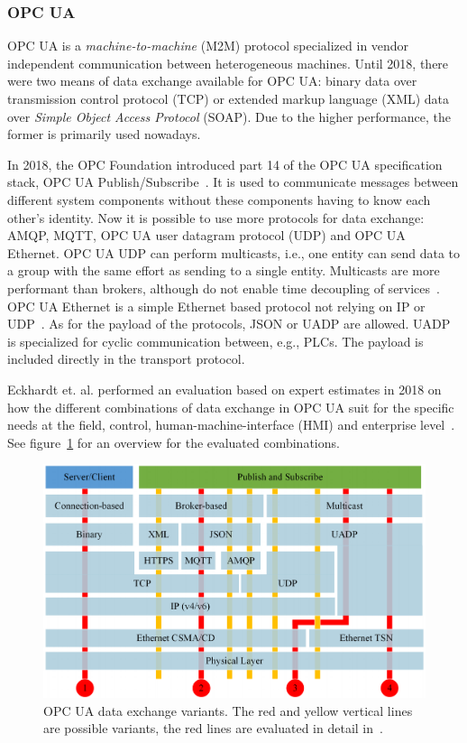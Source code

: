 \subsubsection{OPC UA}
OPC UA is a \textit{machine-to-machine} (M2M) protocol specialized in vendor independent communication between heterogeneous machines. Until 2018, there were two means of data exchange available for OPC UA: binary data over transmission control protocol (TCP) or extended markup language (XML) data over \textit{Simple Object Access Protocol} (SOAP). Due to the higher performance, the former is primarily used nowadays.~\cite{Schleipen2016OPCVariability} 

In 2018, the OPC Foundation introduced part 14 of the OPC UA specification stack, OPC UA Publish/Subscribe~\cite{OPC-Foundation2018OPC1.04}. It is used to communicate messages between different system components without these components having to know each other’s identity. Now it is possible to use more protocols for data exchange: AMQP, MQTT, OPC UA user datagram protocol (UDP) and OPC UA Ethernet. OPC UA UDP can perform multicasts, i.e., one entity can send data to a group with the same effort as sending to a single entity. Multicasts are more performant than brokers, although do not enable time decoupling of services~\cite{Eckhardt2018AnCases}. OPC UA Ethernet is a simple Ethernet based protocol not relying on IP or UDP~\cite{OPC-Foundation2018OPC1.04}. As for the payload of the protocols, JSON or UADP are allowed. UADP is specialized for cyclic communication between, e.g., PLCs. The payload is included directly in the transport protocol.

Eckhardt et. al. performed an evaluation based on expert estimates in 2018 on how the different combinations of data exchange in OPC UA suit for the specific needs at the field, control, human-machine-interface (HMI) and enterprise level~\cite{Eckhardt2018AnCases}. See figure~\ref{fig:opc_ua_dataexchange} for an overview for the evaluated combinations.

\begin{figure}[ht]
    \centering
    \includegraphics[width=\textwidth]{img/OPC_UA_Data_Exchange.png}
    \caption[OPC UA Data Exchange Variants]{OPC UA data exchange variants. The red and yellow vertical lines are possible variants, the red lines are evaluated in detail in~\cite{Eckhardt2018AnCases}.}
    \label{fig:opc_ua_dataexchange}
\end{figure}

